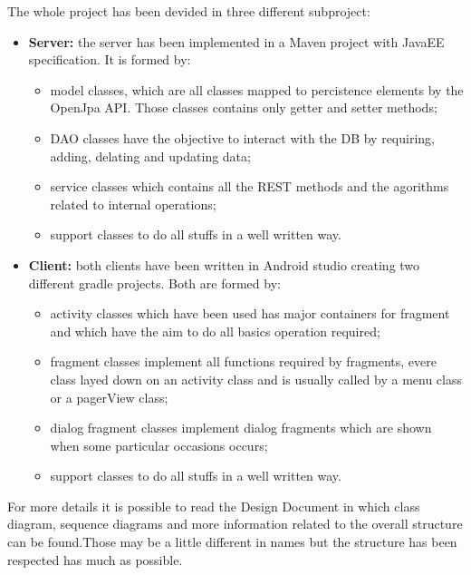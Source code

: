The whole project has been devided in three different subproject:\\
\begin{itemize}
	\item \textbf{Server: } the server has been implemented in a Maven project with JavaEE specification. It is formed by:
		\begin{itemize}
			\item  model classes, which are all classes mapped to percistence elements by the OpenJpa API. Those classes 					contains only getter and setter methods;
			\item DAO classes have the objective to interact with the DB by requiring, adding, delating and updating data;
			\item  service classes which contains all the REST methods and the agorithms related to internal operations;
			\item support classes to do all stuffs in a well written way.
		\end{itemize}

	\item \textbf{Client: } both clients have been written in Android studio creating two different gradle projects. Both are formed by:			\begin{itemize}
			\item  activity classes which have been used has major containers for fragment and which have the aim to do all 					basics operation required;
			\item fragment classes implement all functions required by fragments, evere class layed down on an activity class 				and is usually called by a menu class or a pagerView class;
			\item dialog fragment classes  implement dialog fragments which are shown when some particular occasions occurs;
			\item support classes to do all stuffs in a well written way.
		\end{itemize}

\end{itemize}For more details it is possible to read the Design Document in which class diagram, sequence diagrams and more information related to the overall structure can be found.Those may be a little different in names but the structure has been respected has much as possible.